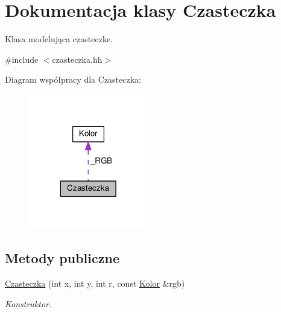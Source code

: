 \hypertarget{class_czasteczka}{\section{Dokumentacja klasy Czasteczka}
\label{class_czasteczka}
}


Klasa modelująca czasteczke.  




{\ttfamily \#include $<$czasteczka.\-hh$>$}



Diagram współpracy dla Czasteczka\-:\nopagebreak
\begin{figure}[H]
\begin{center}
\leavevmode
\includegraphics[width=148pt]{class_czasteczka__coll__graph}
\end{center}
\end{figure}
\subsection*{Metody publiczne}
\begin{DoxyCompactItemize}
\item 
\hyperlink{class_czasteczka_a8e8196c934b65fa6a5b37941354ab68d}{Czasteczka} (int x, int y, int r, const \hyperlink{class_kolor}{Kolor} \&rgb)
\begin{DoxyCompactList}\small\item\em Konstruktor. \end{DoxyCompactList}\end{DoxyCompactItemize}
